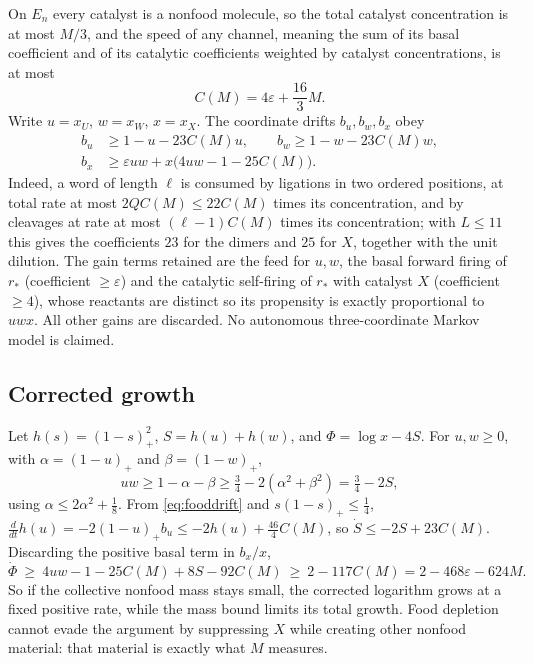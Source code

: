 \documentclass[11pt,letterpaper]{article}
\theoremstyle{plain}
\theoremstyle{definition}
\theoremstyle{remark}
\numberwithin{equation}{section}
\newcommand{\eps}{\varepsilon}
\begin{document}
On $E_n$ every catalyst is a nonfood molecule, so the total catalyst concentration is at most $M/3$, and the speed of any channel, meaning the sum of its basal coefficient and of its catalytic coefficients weighted by catalyst concentrations, is at most
\begin{equation}\label{eq:CM}
 C(M)=4\eps+\frac{16}3M .
\end{equation}
Write $u=x_U$, $w=x_W$, $x=x_X$. The coordinate drifts $b_u,b_w,b_x$ obey
\begin{align}
 b_u&\ge1-u-23C(M)u,\qquad b_w\ge1-w-23C(M)w,\label{eq:fooddrift}\\
 b_x&\ge\eps uw+x\bigl(4uw-1-25C(M)\bigr).\label{eq:productdrift}
\end{align}
Indeed, a word of length $\ell$ is consumed by ligations in two ordered positions, at total rate at most $2QC(M)\le22C(M)$ times its concentration, and by cleavages at rate at most $(\ell-1)C(M)$ times its concentration; with $L\le11$ this gives the coefficients $23$ for the dimers and $25$ for $X$, together with the unit dilution. The gain terms retained are the feed for $u,w$, the basal forward firing of $r_*$ (coefficient $\ge\eps$) and the catalytic self-firing of $r_*$ with catalyst $X$ (coefficient $\ge4$), whose reactants are distinct so its propensity is exactly proportional to $uwx$. All other gains are discarded. No autonomous three-coordinate Markov model is claimed.

\subsection{Corrected growth}
Let $h(s)=(1-s)_+^2$, $S=h(u)+h(w)$, and $\Phi=\log x-4S$. For $u,w\ge0$, with $\alpha=(1-u)_+$ and $\beta=(1-w)_+$,
\[
 uw\ge1-\alpha-\beta\ge\tfrac34-2(\alpha^2+\beta^2)=\tfrac34-2S ,
\]
using $\alpha\le2\alpha^2+\tfrac18$. From \eqref{eq:fooddrift} and $s(1-s)_+\le\tfrac14$, $\frac{d}{dt}h(u)=-2(1-u)_+b_u\le-2h(u)+\frac{46}{4}C(M)$, so $\dot S\le-2S+23C(M)$. Discarding the positive basal term in $b_x/x$,
\begin{equation}\label{eq:potential}
 \dot\Phi\ \ge\ 4uw-1-25C(M)+8S-92C(M)\ \ge\ 2-117C(M)=2-468\eps-624M .
\end{equation}
So if the collective nonfood mass stays small, the corrected logarithm grows at a fixed positive rate, while the mass bound limits its total growth. Food depletion cannot evade the argument by suppressing $X$ while creating other nonfood material: that material is exactly what $M$ measures.
\end{document}
